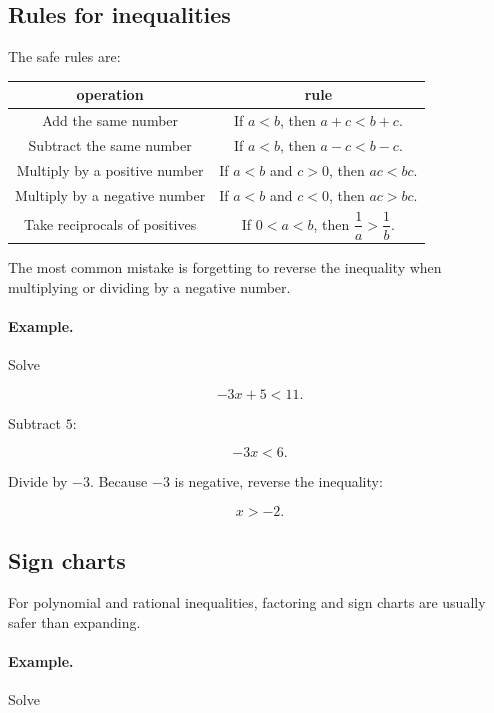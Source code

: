 \subsection{Rules for inequalities}
\label{appsubsec:rules-inequalities}

The safe rules are:

\begin{center}
\renewcommand{\arraystretch}{1.7}
\begin{tabular}{c|c}
\textbf{operation} & \textbf{rule} \\ \hline
Add the same number & If \(a<b\), then \(a+c<b+c\). \\

Subtract the same number & If \(a<b\), then \(a-c<b-c\). \\

Multiply by a positive number & If \(a<b\) and \(c>0\), then \(ac<bc\). \\

Multiply by a negative number & If \(a<b\) and \(c<0\), then \(ac>bc\). \\

Take reciprocals of positives & If \(0<a<b\), then \(\dfrac1a>\dfrac1b\).
\end{tabular}
\end{center}

The most common mistake is forgetting to reverse the inequality when multiplying or
dividing by a negative number.

\paragraph{Example.}
Solve

\[
-3x+5<11.
\]

Subtract \(5\):

\[
-3x<6.
\]

Divide by \(-3\).  Because \(-3\) is negative, reverse the inequality:

\[
\boxed{
x>-2.
}
\]

\subsection{Sign charts}
\label{appsubsec:sign-charts-inequalities}

For polynomial and rational inequalities, factoring and sign charts are usually safer
than expanding.

\paragraph{Example.}
Solve

